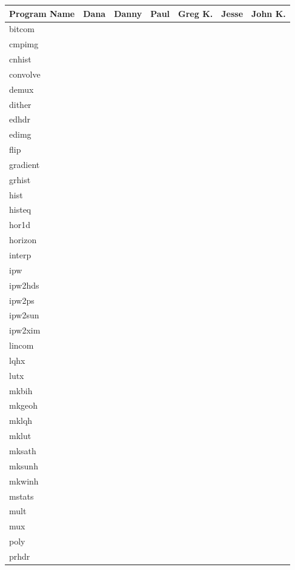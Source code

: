 \begin{tabular}{||l|l|l|l|l|l|l||} \hline
Program Name & Dana & Danny & Paul & Greg K. & Jesse & John K. \\ \hline\hline
bitcom & & & & & & \\ \hline
cmpimg & & & & & & \\ \hline
cnhist & & & & & & \\ \hline
convolve & & & & & & \\ \hline
demux & & & & & & \\ \hline
dither & & & & & & \\ \hline
edhdr & & & & & & \\ \hline
edimg & & & & & & \\ \hline
flip & & & & & & \\ \hline
gradient & & & & & & \\ \hline
grhist & & & & & & \\ \hline
hist & & & & & & \\ \hline
histeq & & & & & & \\ \hline
hor1d & & & & & & \\ \hline
horizon & & & & & & \\ \hline
interp & & & & & & \\ \hline
ipw & & & & & & \\ \hline
ipw2hds & & & & & & \\ \hline
ipw2ps & & & & & & \\ \hline
ipw2sun & & & & & & \\ \hline
ipw2xim & & & & & & \\ \hline
lincom & & & & & & \\ \hline
lqhx & & & & & & \\ \hline
lutx & & & & & & \\ \hline
mkbih & & & & & & \\ \hline
mkgeoh & & & & & & \\ \hline
mklqh & & & & & & \\ \hline
mklut & & & & & & \\ \hline
mksath & & & & & & \\ \hline
mksunh & & & & & & \\ \hline
mkwinh & & & & & & \\ \hline
mstats & & & & & & \\ \hline
mult & & & & & & \\ \hline
mux & & & & & & \\ \hline
poly & & & & & & \\ \hline
prhdr & & & & & & \\ \hline

\end{tabular}
